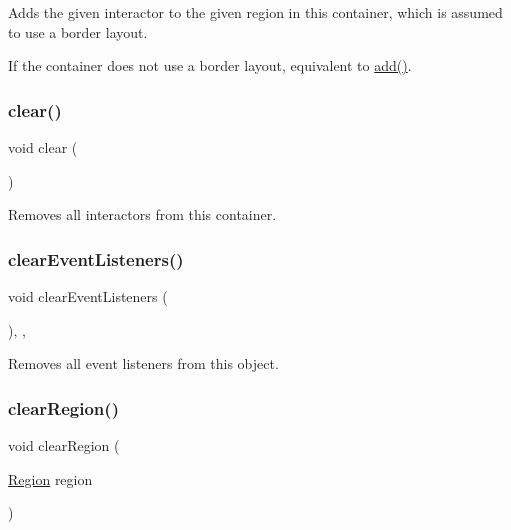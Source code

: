 Adds the given interactor to the given region in this container, which is assumed to use a border layout. 

If the container does not use a border layout, equivalent to \mbox{\hyperlink{classGContainer_a6f99b7c841256dbdc5acaafbbca4e685}{add()}}. \mbox{\label{classGContainer_ac8bb3912a3ce86b15842e79d0b421204}} 
\subsubsection{\texorpdfstring{clear()}{clear()}}
{\footnotesize\ttfamily void clear (\begin{DoxyParamCaption}{ }\end{DoxyParamCaption})\hspace{0.3cm}{\ttfamily [virtual]}}



Removes all interactors from this container. 

\mbox{\label{classGObservable_a80cfa040459ff53594adbd6a51ec8f43}} 
\subsubsection{\texorpdfstring{clear\+Event\+Listeners()}{clearEventListeners()}}
{\footnotesize\ttfamily void clear\+Event\+Listeners (\begin{DoxyParamCaption}{ }\end{DoxyParamCaption})\hspace{0.3cm}{\ttfamily [protected]}, {\ttfamily [virtual]}, {\ttfamily [inherited]}}



Removes all event listeners from this object. 

\mbox{\label{classGContainer_a47f0cc45498a78757fa4d0e6befc2981}} 
\subsubsection{\texorpdfstring{clear\+Region()}{clearRegion()}\hspace{0.1cm}{\footnotesize\ttfamily [1/2]}}
{\footnotesize\ttfamily void clear\+Region (\begin{DoxyParamCaption}\item[{\mbox{\hyperlink{classGContainer_a81a01a86de31071a92e6cce0bab9bc4b}{Region}}}]{region }\end{DoxyParamCaption})\hspace{0.3cm}{\ttfamily [virtual]}}



